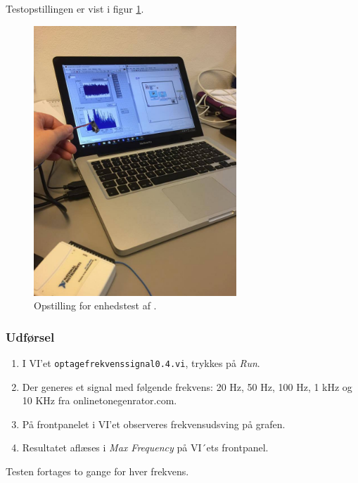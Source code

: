 		Testopstillingen er vist i figur \ref{fig:elektrettoop}.\\
		
		\begin{figure}
			\centering
			\includegraphics[width=3in]{elektrettoop.jpg}
			\caption{Opstilling for enhedstest af \elektretto.}
			\label{fig:elektrettoop}
		\end{figure}
	
		\subsubsection{Udførsel}
			\begin{enumerate}
				\item I VI'et \texttt{optagefrekvenssignal0.4.vi}, trykkes på \textit{Run}.  
				\item Der generes et signal med følgende frekvens: 20 Hz, 50 Hz, 100 Hz, 1 kHz og 10 KHz fra onlinetonegenrator.com.
				\item På frontpanelet i VI'et observeres frekvensudsving på grafen.   
				\item Resultatet aflæses i \textit{Max Frequency} på VI´ets frontpanel.
			\end{enumerate}
			
			Testen fortages to gange for hver frekvens.  
		
